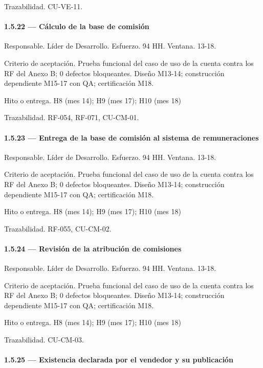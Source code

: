 \documentclass[11pt]{article}
\begin{document}
Trazabilidad. CU-VE-11.

\paragraph{1.5.22 — Cálculo de la base de comisión}

Responsable. Líder de Desarrollo. Esfuerzo. 94 HH. Ventana. 13-18.

Criterio de aceptación. Prueba funcional del caso de uso de la cuenta contra los RF del Anexo B; 0 defectos bloqueantes. Diseño M13-14; construcción dependiente M15-17 con QA; certificación M18.

Hito o entrega. H8 (mes 14); H9 (mes 17); H10 (mes 18)

Trazabilidad. RF-054, RF-071, CU-CM-01.

\paragraph{1.5.23 — Entrega de la base de comisión al sistema de remuneraciones}

Responsable. Líder de Desarrollo. Esfuerzo. 94 HH. Ventana. 13-18.

Criterio de aceptación. Prueba funcional del caso de uso de la cuenta contra los RF del Anexo B; 0 defectos bloqueantes. Diseño M13-14; construcción dependiente M15-17 con QA; certificación M18.

Hito o entrega. H8 (mes 14); H9 (mes 17); H10 (mes 18)

Trazabilidad. RF-055, CU-CM-02.

\paragraph{1.5.24 — Revisión de la atribución de comisiones}

Responsable. Líder de Desarrollo. Esfuerzo. 94 HH. Ventana. 13-18.

Criterio de aceptación. Prueba funcional del caso de uso de la cuenta contra los RF del Anexo B; 0 defectos bloqueantes. Diseño M13-14; construcción dependiente M15-17 con QA; certificación M18.

Hito o entrega. H8 (mes 14); H9 (mes 17); H10 (mes 18)

Trazabilidad. CU-CM-03.

\paragraph{1.5.25 — Existencia declarada por el vendedor y su publicación}
\end{document}
